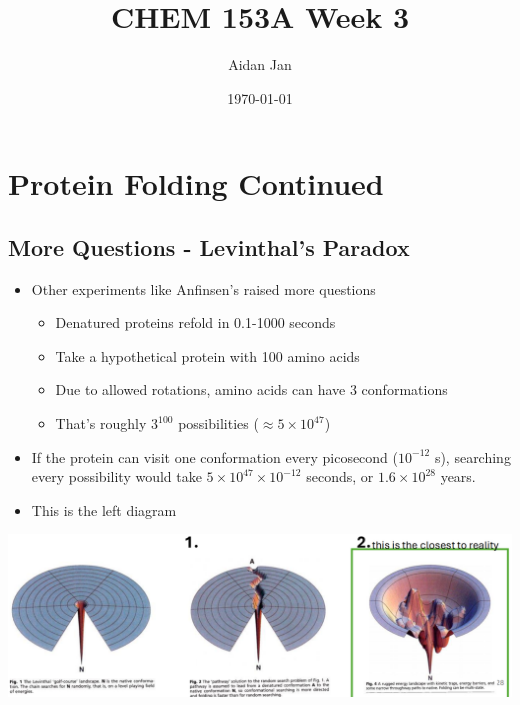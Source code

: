 \documentclass[10pt]{article}
\title{CHEM 153A Week 3}
\author{Aidan Jan}
\date{\today}
\begin{document}
\maketitle
\section*{Protein Folding Continued}
\subsection*{More Questions - Levinthal's Paradox}
\begin{itemize}
    \item Other experiments like Anfinsen's raised more questions
    \begin{itemize}
        \item Denatured proteins refold in 0.1-1000 seconds
        \item Take a hypothetical protein with 100 amino acids
        \item Due to allowed rotations, amino acids can have 3 conformations
        \item That's roughly $3^{100}$ possibilities ($\approx 5 \times 10^{47}$)
    \end{itemize}
    \item If the protein can visit one conformation every picosecond ($10^{-12}$ s), searching every possibility would take $5 \times 10^{47} \times 10^{-12}$ seconds, or $1.6 \times 10^{28}$ years.
    \item This is the left diagram
\end{itemize}
\begin{center}
    \includegraphics*[width=\textwidth]{L1_1.png}
\end{center}
\end{document}
